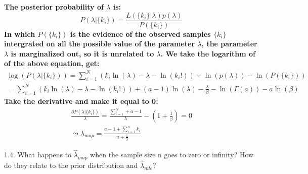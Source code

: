 \documentclass{article}
\theoremstyle{definition}
\theoremstyle{definition}
\theoremstyle{remark}
\begin{document}
\begin{addmargin}[3em]{2em}
  \textbf{The posterior probability of $\lambda$ is:}
  \[
  P(\lambda | \{k_i\}) = \frac{L(\{k_i\} | \lambda) p(\lambda)}{P(\{k_i\})}
  \]
  \textbf{In which $P(\{k_i\})$ is the evidence of the observed samples $\{k_i\}$ intergrated on all the possible value of the parameter $\lambda$, the parameter $\lambda$ is marginalized out, so it is unrelated to $\lambda$. We take the logarithm of of the above equation, get:}
  \[
  \begin{split}
  \log(P(\lambda | \{k_i\})) = \sum_{i=1}^N (k_i \ln(\lambda) - \lambda - \ln(k_i!)) + \ln(p(\lambda)) - \ln(P(\{k_i\})) \\
  = \sum_{i=1}^N (k_i \ln(\lambda) - \lambda - \ln(k_i!)) + (a-1)\ln(\lambda) - \frac{\lambda}{\beta} - \ln(\Gamma(a)) - a \ln(\beta)
  \end{split}
  \]
  \textbf{Take the derivative and make it equal to 0:}
  \[
  \begin{split}
  \frac{\partial P(\lambda | \{k_i\})}{\lambda} = \frac{\sum_{i=1}^N + a - 1}{\lambda} - (1 + \frac{1}{\beta}) = 0 \\
  \leadsto \lambda_{map} = \frac{a - 1 + \sum_{i=1}^n k_i}{n + \frac{1}{\beta}}
  \end{split}
  \]

\end{addmargin}

1.4. What happens to $\hat{\lambda}_{map}$ when the sample size n goes to zero or infinity? How do they relate to the prior distribution and $\hat{\lambda}_{mle}$?
\end{document}

